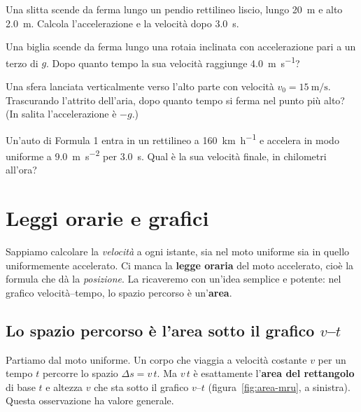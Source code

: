 \begin{esercizio}
Una slitta scende da ferma lungo un pendio rettilineo liscio, lungo \SI{20}{\metre} e alto \SI{2,0}{\metre}. Calcola l'accelerazione e la velocità dopo \SI{3,0}{\second}.\\
\end{esercizio}

\begin{esercizio}
Una biglia scende da ferma lungo una rotaia inclinata con accelerazione pari a un terzo di $g$. Dopo quanto tempo la sua velocità raggiunge \SI{4,0}{\metre\per\second}?\\
\end{esercizio}

\begin{esercizio}
Una sfera lanciata verticalmente verso l'alto parte con velocità $v_0 = \SI{15}{\metre\per\second}$. Trascurando l'attrito dell'aria, dopo quanto tempo si ferma nel punto più alto? (In salita l'accelerazione è $-g$.)\\
\end{esercizio}

\begin{esercizio}
Un'auto di Formula 1 entra in un rettilineo a \SI{160}{\kilo\metre\per\hour} e accelera in modo uniforme a \SI{9,0}{\metre\per\second\squared} per \SI{3,0}{\second}. Qual è la sua velocità finale, in chilometri all'ora?\\
\end{esercizio}

\section{Leggi orarie e grafici}

Sappiamo calcolare la \emph{velocità} a ogni istante, sia nel moto uniforme sia in quello uniformemente accelerato. Ci manca la \textbf{legge oraria} del moto accelerato, cioè la formula che dà la \emph{posizione}. La ricaveremo con un'idea semplice e potente: nel grafico velocità--tempo, lo spazio percorso è un'\textbf{area}.

\subsection{Lo spazio percorso è l'area sotto il grafico \texorpdfstring{$v$--$t$}{v-t}}
Partiamo dal moto uniforme. Un corpo che viaggia a velocità costante $v$ per un tempo $t$ percorre lo spazio $\Delta s = v\,t$. Ma $v\,t$ è esattamente l'\textbf{area del rettangolo} di base $t$ e altezza $v$ che sta sotto il grafico $v$--$t$ (figura~\ref{fig:area-mru}, a sinistra). Questa osservazione ha valore generale.

